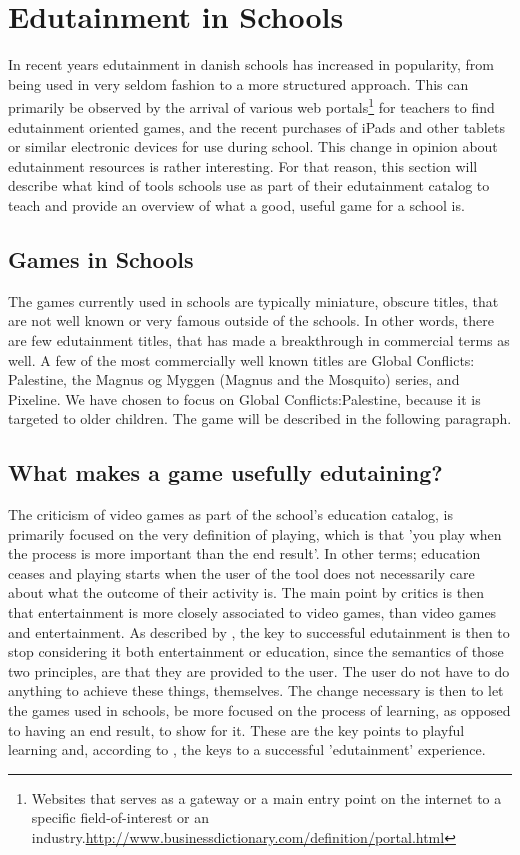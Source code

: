 \section{Edutainment in Schools}
\label{sec:eduinsch}
In recent years edutainment in danish schools has increased in popularity, from being used in very seldom fashion to a more structured approach. 
This can primarily be observed by the arrival of various web portals\footnote{Websites that serves as a gateway or a main entry point on the internet to a specific field-of-interest or an industry.\url{http://www.businessdictionary.com/definition/portal.html}} for teachers to find edutainment oriented games, and the recent purchases of iPads and other tablets or similar electronic devices for use during school.
This change in opinion about edutainment resources is rather interesting. For that reason, this section will describe what kind of tools schools use as part of their edutainment catalog to teach and provide an overview of what a good, useful game for a school is.


\subsection{Games in Schools}

The games currently used in schools are typically miniature, obscure titles, that are not well known or very famous outside of the schools.
 In other words, there are few edutainment titles, that has made a breakthrough in commercial terms as well.
 A few of the most commercially well known titles are Global Conflicts: Palestine, the Magnus og Myggen (Magnus and the Mosquito) series, and Pixeline.
 We have chosen to focus on Global Conflicts:Palestine, because it is targeted to older children. The game will be described in the following paragraph.

\subsection{What makes a game usefully edutaining?}

The criticism of video games as part of the school's education catalog, is primarily focused on the very definition of playing, which is that 'you play when the process is more important than the end result'.
In other terms; education ceases and playing starts when the user of the tool does not necessarily care about what the outcome of their activity is.
The main point by critics is then that entertainment is more closely associated to video games, than video games and entertainment.
As described by \citep{edunoty}, the key to successful edutainment is then to stop considering it both entertainment or education, since the semantics of those two principles, are that they are provided to the user. The user do not have to do anything to achieve these things, themselves.
The change necessary is then to let the games used in schools, be more focused on the process of learning, as opposed to having an end result, to show for it.
These are the key points to playful learning and, according to \cite{edunoty}, the keys to a successful 'edutainment' experience.

